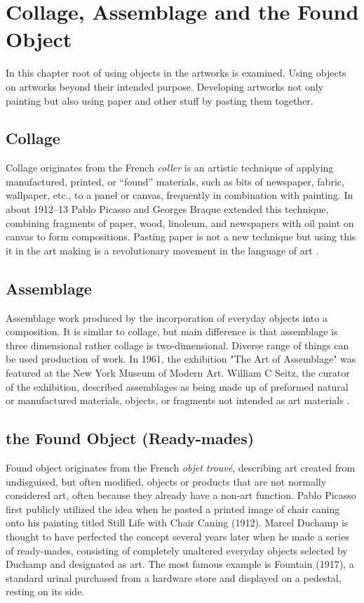 \documentclass[12pt]{article}
\begin{document}
\section{Collage, Assemblage and the Found Object}
In this chapter root of using objects in the artworks is examined. Using objects on artworks beyond their intended purpose. Developing artworks not only painting but also using paper and other stuff by pasting them together.

\subsection{Collage}
Collage originates from the French \textit{coller} is an artistic technique of applying manufactured, printed, or “found” materials, such as bits of newspaper, fabric, wallpaper, etc., to a panel or canvas, frequently in combination with painting. In about 1912–13 Pablo Picasso and Georges Braque extended this technique, combining fragments of paper, wood, linoleum, and newspapers with oil paint on canvas to form compositions. Pasting paper is not a new technique but using this it in the art making is a revolutionary movement in the  language of art \cite{waldman1992collage}.

\cite{greenberg1984collage}

\subsection{Assemblage}
Assemblage work produced by the incorporation of everyday objects into a composition. It is similar to collage, but main difference is that assemblage is three dimensional rather collage is two-dimensional. Diverse range of things can be used production of work. In 1961, the exhibition "The Art of Assemblage" was featured at the New York Museum of Modern Art. William C Seitz, the curator of the exhibition, described assemblages as being made up of preformed natural or manufactured materials, objects, or fragments not intended as art materials \cite{seitz1961art}.

\subsection{the Found Object (Ready-mades)}
Found object originates from the French \textit{objet trouvé}, describing art created from undisguised, but often modified, objects or products that are not normally considered art, often because they already have a non-art function. Pablo Picasso first publicly utilized the idea when he pasted a printed image of chair caning onto his painting titled Still Life with Chair Caning (1912). Marcel Duchamp is thought to have perfected the concept several years later when he made a series of ready-mades, consisting of completely unaltered everyday objects selected by Duchamp and designated as art. The most famous example is Fountain (1917), a standard urinal purchased from a hardware store and displayed on a pedestal, resting on its side.
\end{document}
